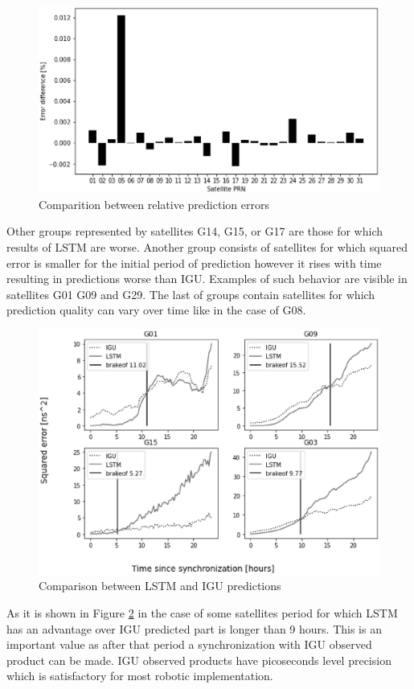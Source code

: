 \documentclass{article}
\begin{document}
\begin{figure}[htb!] 
\centering
	\includegraphics[width=\textwidth]{figures/rel_err_diff}
\caption{Comparition between relative prediction errors}
\label{fig:relative_error_comparition}
\end{figure}

Other groups represented by satellites G14, G15, or G17 are those  for which results of LSTM 
are worse. Another group consists of satellites for which 
squared error is smaller for the initial period of prediction however it rises with time resulting
in predictions worse than IGU. Examples of such behavior are visible in satellites G01
G09 and G29. The last of groups contain satellites for which prediction quality can vary over
time like in the case of G08.
\begin{figure}[htb] 
\centering
	\includegraphics[width=\textwidth]{figures/brakeoff_compare}
\caption{Comparison between LSTM and IGU predictions}
\label{fig:cutoff}
\end{figure}
As it is shown in Figure \ref{fig:cutoff} in the case of some satellites period for which LSTM
has an advantage over IGU predicted part is longer than 9 hours. This is an important value as after that period a synchronization with IGU observed product can be made.
IGU observed products have picoseconds level precision which is satisfactory for most 
robotic implementation.
\end{document}
